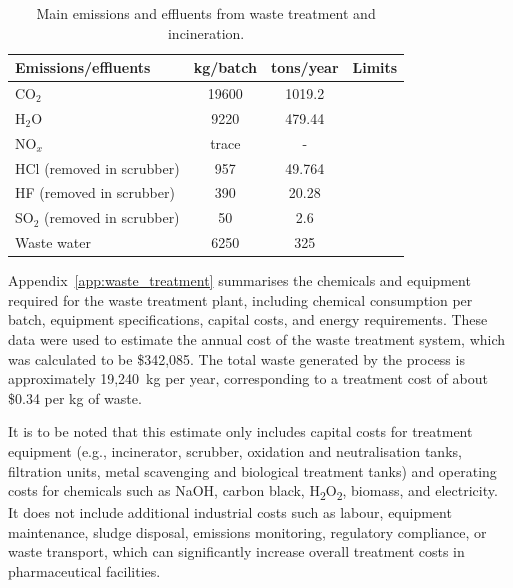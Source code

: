 \begin{table}[htbp]
    \centering
    \caption{Main emissions and effluents from waste treatment and incineration.}
    \label{tab:emissions_effluents}
    \small
    \begin{tabularx}{\textwidth}{|>{\raggedright\arraybackslash}X|c|c|>{\raggedright\arraybackslash}X|}
        \hline
        \textbf{Emissions/effluents} & \textbf{kg/batch} & \textbf{tons/year} & \textbf{Limits} \\
        \hline
        CO$_2$                       & 19600             & 1019.2             &                 \\
        \hline
        H$_2$O                       & 9220              & 479.44             &                 \\
        \hline
        NO$_x$                       & trace             & -                  &                 \\
        \hline
        HCl (removed in scrubber)    & 957               & 49.764             &                 \\
        \hline
        HF (removed in scrubber)     & 390               & 20.28              &                 \\
        \hline
        SO$_2$ (removed in scrubber) & 50                & 2.6                &                 \\
        \hline
        Waste water                  & 6250              & 325                &                 \\
        \hline
    \end{tabularx}
    \normalsize
\end{table}

Appendix~\ref{app:waste_treatment} summarises the chemicals and equipment required for the waste treatment plant, including chemical consumption per batch, equipment specifications, capital costs, and energy requirements. These data were used to estimate the annual cost of the waste treatment system, which was calculated to be \$342,085. The total waste generated by the process is approximately 19,240~kg per year, corresponding to a treatment cost of about \$0.34 per kg of waste.

It is to be noted that this estimate only includes capital costs for treatment equipment (e.g., incinerator, scrubber, oxidation and neutralisation tanks, filtration units, metal scavenging and biological treatment tanks) and operating costs for chemicals such as NaOH, carbon black, H\textsubscript{2}O\textsubscript{2}, biomass, and electricity. It does not include additional industrial costs such as labour, equipment maintenance, sludge disposal, emissions monitoring, regulatory compliance, or waste transport, which can significantly increase overall treatment costs in pharmaceutical facilities.

